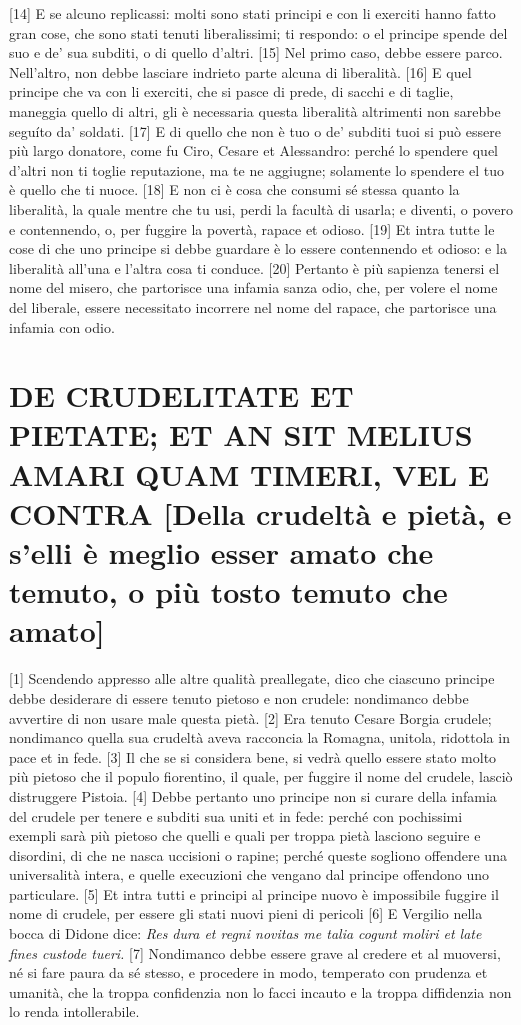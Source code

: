 {[}14{]} E se alcuno replicassi: molti sono stati principi e con li
exerciti hanno fatto gran cose, che sono stati tenuti liberalissimi; ti
respondo: o el principe spende del suo e de' sua subditi, o di quello
d'altri. {[}15{]} Nel primo caso, debbe essere parco. Nell'altro, non
debbe lasciare indrieto parte alcuna di liberalità. {[}16{]} E quel
principe che va con li exerciti, che si pasce di prede, di sacchi e di
taglie, maneggia quello di altri, gli è necessaria questa liberalità
altrimenti non sarebbe seguíto da' soldati. {[}17{]} E di quello che non
è tuo o de' subditi tuoi si può essere più largo donatore, come fu Ciro,
Cesare et Alessandro: perché lo spendere quel d'altri non ti toglie
reputazione, ma te ne aggiugne; solamente lo spendere el tuo è quello
che ti nuoce. {[}18{]} E non ci è cosa che consumi sé stessa quanto la
liberalità, la quale mentre che tu usi, perdi la facultà di usarla; e
diventi, o povero e contennendo, o, per fuggire la povertà, rapace et
odioso. {[}19{]} Et intra tutte le cose di che uno principe si debbe
guardare è lo essere contennendo et odioso: e la liberalità all'una e
l'altra cosa ti conduce. {[}20{]} Pertanto è più sapienza tenersi el
nome del misero, che partorisce una infamia sanza odio, che, per volere
el nome del liberale, essere necessitato incorrere nel nome del rapace,
che partorisce una infamia con odio.

\quebra\section{DE CRUDELITATE ET PIETATE; ET AN SIT MELIUS AMARI QUAM TIMERI, VEL E CONTRA
{[}Della crudeltà e pietà, e s'elli è meglio esser amato che temuto, o
più tosto temuto che amato{]}}

{[}1{]} Scendendo appresso alle altre qualità preallegate, dico che
ciascuno principe debbe desiderare di essere tenuto pietoso e non
crudele: nondimanco debbe avvertire di non usare male questa pietà.
{[}2{]} Era tenuto Cesare Borgia crudele; nondimanco quella sua crudeltà
aveva racconcia la Romagna, unitola, ridottola in pace et in fede.
{[}3{]} Il che se si considera bene, si vedrà quello essere stato molto
più pietoso che il populo fiorentino, il quale, per fuggire il nome del
crudele, lasciò distruggere Pistoia. {[}4{]} Debbe pertanto uno principe
non si curare della infamia del crudele per tenere e subditi sua uniti
et in fede: perché con pochissimi exempli sarà più pietoso che quelli e
quali per troppa pietà lasciono seguire e disordini, di che ne nasca
uccisioni o rapine; perché queste sogliono offendere una universalità
intera, e quelle execuzioni che vengano dal principe offendono uno
particulare. {[}5{]} Et intra tutti e principi al principe nuovo è
impossibile fuggire il nome di crudele, per essere gli stati nuovi pieni
di pericoli {[}6{]} E Vergilio nella bocca di Didone dice: \emph{Res
dura et regni novitas me talia cogunt moliri et late fines custode
tueri.} {[}7{]} Nondimanco debbe essere grave al credere et al muoversi,
né si fare paura da sé stesso, e procedere in modo, temperato con
prudenza et umanità, che la troppa confidenzia non lo facci incauto e la
troppa diffidenzia non lo renda intollerabile.

